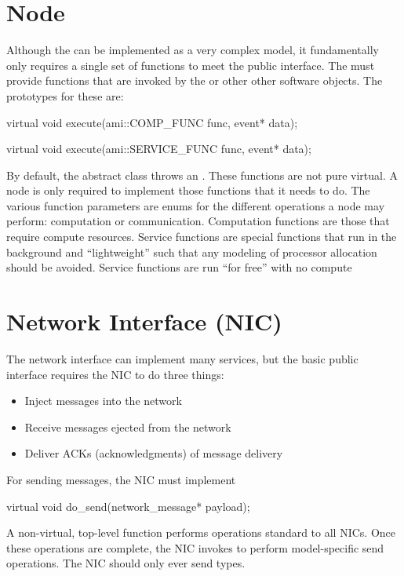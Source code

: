 \section{Node}\label{sec:node}
Although the \nodecls can be implemented as a very complex model, it fundamentally only requires a single set of functions to meet the public interface.
The \nodecls must provide  functions that are invoked by the  or other other software objects.
The prototypes for these are:

\begin{CppCode}
virtual void execute(ami::COMP_FUNC func, event* data);

virtual void execute(ami::SERVICE_FUNC func, event* data);
\end{CppCode}	

By default, the abstract \nodecls class throws an . These functions are not pure virtual.
A node is only required to implement those functions that it needs to do.
The various function parameters are enums for the different operations a node may perform:
computation or communication. Computation functions are those that require compute resources. Service functions are special functions that run in the background and ``lightweight'' such that any modeling of processor allocation should be avoided. Service functions are run ``for free'' with no compute 

\section{Network Interface (NIC)}\label{sec:nic}
The network interface can implement many services, but the basic public interface requires the NIC to do three things:

\begin{itemize}
\item Inject messages into the network
\item Receive messages ejected from the network
\item Deliver ACKs (acknowledgments) of message delivery
\end{itemize}

For sending messages, the NIC must implement

\begin{CppCode}
  virtual void do_send(network_message* payload);
\end{CppCode}
A non-virtual, top-level  function performs operations standard to all NICs.
Once these operations are complete, the NIC invokes  to perform model-specific send operations.
The NIC should only ever send  types.


